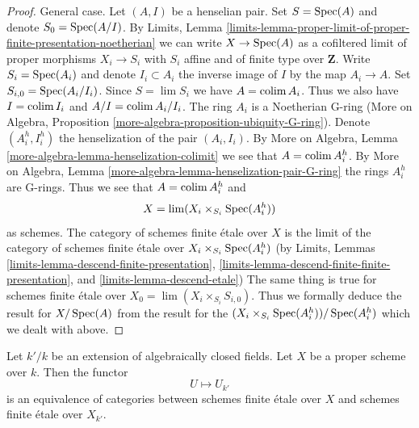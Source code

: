 \begin{proof}
\medskip\noindent
General case. Let $(A, I)$ be a henselian pair.
Set $S = \mathop{\mathrm{Spec}}(A)$ and denote $S_0 = \mathop{\mathrm{Spec}}(A/I)$. By Limits, Lemma
\ref{limits-lemma-proper-limit-of-proper-finite-presentation-noetherian}
we can write $X \to \mathop{\mathrm{Spec}}(A)$ as a cofiltered limit of
proper morphisms $X_i \to S_i$ with $S_i$ affine and of finite type
over $\mathbf{Z}$. Write $S_i = \mathop{\mathrm{Spec}}(A_i)$ and denote
$I_i \subset A_i$ the inverse image of $I$ by the map $A_i \to A$.
Set $S_{i, 0} = \mathop{\mathrm{Spec}}(A_i/I_i)$. Since $S = \lim S_i$ we have
$A = \mathop{\mathrm{colim}}\nolimits A_i$. Thus we also have $I = \mathop{\mathrm{colim}}\nolimits I_i$ and $A/I = \mathop{\mathrm{colim}}\nolimits A_i/I_i$.
The ring $A_i$ is a Noetherian G-ring (More on Algebra, Proposition
\ref{more-algebra-proposition-ubiquity-G-ring}).
Denote $(A_i^h, I_i^h)$ the henselization of the pair $(A_i, I_i)$.
By More on Algebra, Lemma \ref{more-algebra-lemma-henselization-colimit}
we see that $A = \mathop{\mathrm{colim}}\nolimits A_i^h$. By
More on Algebra, Lemma \ref{more-algebra-lemma-henselization-pair-G-ring}
the rings $A_i^h$ are G-rings. Thus we see that $A = \mathop{\mathrm{colim}}\nolimits A_i^h$ and
$$
X = \mathop{\mathrm{lim}}\nolimits (X_i \times_{S_i} \mathop{\mathrm{Spec}}(A_i^h))
$$
as schemes. The category of schemes finite \'etale over $X$ is the limit
of the category of schemes finite \'etale over
$X_i \times_{S_i} \mathop{\mathrm{Spec}}(A_i^h)$ (by
Limits, Lemmas
\ref{limits-lemma-descend-finite-presentation},
\ref{limits-lemma-descend-finite-finite-presentation}, and
\ref{limits-lemma-descend-etale})
The same thing is true for schemes finite \'etale over
$X_0 = \lim (X_i \times_{S_i} S_{i, 0})$.
Thus we formally deduce the result for $X / \mathop{\mathrm{Spec}}(A)$
from the result for the $(X_i \times_{S_i} \mathop{\mathrm{Spec}}(A_i^h)) / \mathop{\mathrm{Spec}}(A_i^h)$
which we dealt with above.
\end{proof}

\begin{lemma}
\label{lemma-finite-etale-invariant-over-proper}
Let $k'/k$ be an extension of algebraically closed fields.
Let $X$ be a proper scheme over $k$. Then the functor
$$
U \longmapsto U_{k'}
$$
is an equivalence of categories between schemes finite \'etale over
$X$ and schemes finite \'etale over $X_{k'}$.
\end{lemma}

